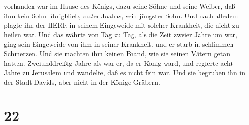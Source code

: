 vorhanden war im Hause des Königs, dazu seine Söhne und seine Weiber,
daß ihm kein Sohn übrigblieb, außer Joahas, sein jüngster Sohn.
 Und nach alledem plagte ihn der HERR in seinem Eingeweide
mit solcher Krankheit, die nicht zu heilen war.  Und das
währte von Tag zu Tag, als die Zeit zweier Jahre um war, ging sein
Eingeweide von ihm in seiner Krankheit, und er starb in schlimmen
Schmerzen. Und sie machten ihm keinen Brand, wie sie seinen Vätern getan
hatten.  Zweiunddreißig Jahre alt war er, da er König ward,
und regierte acht Jahre zu Jerusalem und wandelte, daß es nicht fein
war. Und sie begruben ihn in der Stadt Davids, aber nicht in der Könige
Gräbern.

\hypertarget{section-21}{%
\section{22}\label{section-21}}

